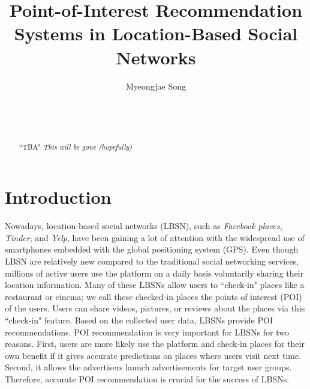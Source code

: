 \documentclass{sig-alternate}
\begin{document}

\title{Point-of-Interest Recommendation Systems in Location-Based Social Networks}


\author{
\alignauthor
Myeongjae Song\\
	\\
	\\
	\\
}

\maketitle
\begin{abstract}
``TBA"
\emph{This will be gone (hopefully)}

\end{abstract}



\section{Introduction}
\label{sec:introduction}

Nowadays, location-based social networks (LBSN), such as \emph{Facebook places, Tinder},  and \emph{Yelp}, 
have been gaining a lot of attention with the widespread use of smartphones embedded with the 
global positioning system (GPS). Even though LBSN are relatively new compared to 
the traditional social networking services, millions of active users use the platform on a daily basis voluntarily sharing 
their location information. Many of these LBSNs allow users to ``check-in" 
places like a restaurant or cinema; we call these checked-in places the points of interest (POI) 
of the users. Users can share videos, pictures, or reviews about the places via this ``check-in" 
feature. Based on the collected user data, LBSNs provide POI recommendations. POI recommendation 
is very important for LBSNs for two reasons. First, users are more likely use the platform and check-in places 
for their own benefit if it gives accurate predictions on places where users visit next time. 
Second, it allows the advertisers launch advertisements for target user groups. Therefore, 
accurate POI recommendation is crucial for the success of LBSNs.
\end{document}
